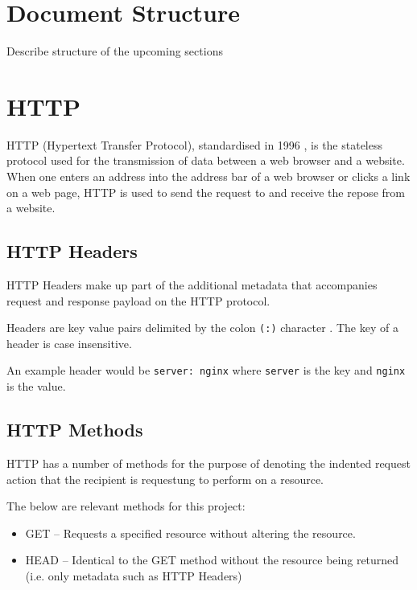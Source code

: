 \documentclass{mscreport}
\begin{document}
\newpage

\section{Document Structure}

Describe structure of the upcoming sections

\newpage

\section{HTTP}

HTTP (Hypertext Transfer Protocol), standardised in 1996 \cite{Berners-Lee1996-ji}, is the stateless protocol used for the transmission of data between a web browser and a website. When one enters an address into the address bar of a web browser or clicks a link on a web page, HTTP is used to send the request to and receive the repose from a website.

\subsection{HTTP Headers}

\noindent HTTP Headers make up part of the additional metadata that accompanies request and response payload on the HTTP protocol.

\vspace{0.3cm}
\noindent Headers are key value pairs delimited by the colon \texttt{(:)} character \cite{Berners-Lee1996-ji}. The key of a header is case insensitive.

\vspace{0.3cm}
\noindent An example header would be \texttt{server: nginx} where \texttt{server} is the key and \texttt{nginx} is the value.

\subsection{HTTP Methods}

\noindent HTTP has a number of methods for the purpose of denoting the indented request action that the recipient is requestung to perform on a resource.

\vspace{0.3cm}
\noindent The below are relevant methods for this project:
\begin{itemize}
	\setlength\itemsep{0.1em}
	\item GET – Requests a specified resource without altering the resource.
	\item HEAD – Identical to the GET method without the resource being returned (i.e. only metadata such as HTTP Headers)
\end{itemize}
\end{document}
